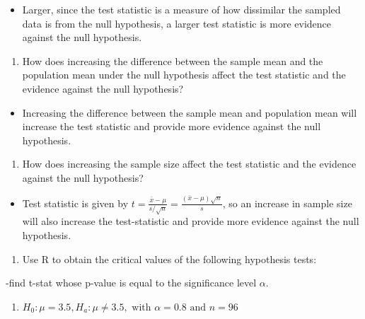\documentclass[
  openany]{book}
\providecommand{\tightlist}{%
  \setlength{\itemsep}{0pt}\setlength{\parskip}{0pt}}
\begin{document}
\begin{itemize}
\tightlist
\item
  Larger, since the test statistic is a measure of how dissimilar the sampled data is from the null hypothesis, a larger test statistic is more evidence against the null hypothesis.
\end{itemize}

\begin{enumerate}
\def\labelenumi{\arabic{enumi}.}
\setcounter{enumi}{11}
\tightlist
\item
  How does increasing the difference between the sample mean and the population mean under the null hypothesis affect the test statistic and the evidence against the null hypothesis?
\end{enumerate}

\begin{itemize}
\tightlist
\item
  Increasing the difference between the sample mean and population mean will increase the test statistic and provide more evidence against the null hypothesis.
\end{itemize}

\begin{enumerate}
\def\labelenumi{\arabic{enumi}.}
\setcounter{enumi}{12}
\tightlist
\item
  How does increasing the sample size affect the test statistic and the evidence against the null hypothesis?
\end{enumerate}

\begin{itemize}
\tightlist
\item
  Test statistic is given by \(t=\frac{\bar{x}-\mu}{s/\sqrt{n}}=\frac{(\bar{x}-\mu)\sqrt{n}}{s}\), so an increase in sample size will also increase the test-statistic and provide more evidence against the null hypothesis.
\end{itemize}

\begin{enumerate}
\def\labelenumi{\arabic{enumi}.}
\setcounter{enumi}{13}
\tightlist
\item
  Use R to obtain the critical values of the following hypothesis tests:
\end{enumerate}

-find t-stat whose p-value is equal to the significance level \(\alpha\).

\begin{enumerate}
\def\labelenumi{\alph{enumi}.}
\tightlist
\item
  \(H_0: \mu = 3.5, H_a: \mu \ne 3.5, \text{ with } \alpha=0.8 \text{ and } n=96\)
\end{enumerate}
\end{document}
